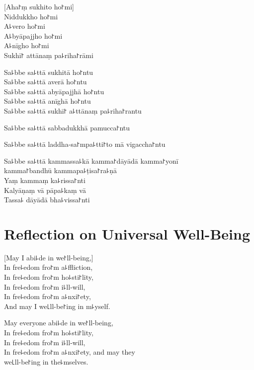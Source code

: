 \begin{leader}
\end{leader}

[Aha꜓ṃ sukhito ho꜓mi]\\
Niddukkho ho꜓mi\\
A꜕vero ho꜓mi\\
A꜕byāpajjho ho꜓mi\\
A꜕nīgho ho꜓mi\\
Sukhī꜓ attānaṃ pa꜕riha꜓rāmi

Sa꜕bbe sa꜕ttā sukhitā ho꜓ntu\\
Sa꜕bbe sa꜕ttā averā ho꜓ntu\\
Sa꜕bbe sa꜕ttā abyāpajjhā ho꜓ntu\\
Sa꜕bbe sa꜕ttā anīghā ho꜓ntu\\
Sa꜕bbe sa꜕ttā sukhī꜓ a꜕ttānaṃ pa꜕riha꜓rantu

Sa꜕bbe sa꜕ttā sabbadukkhā pamucca꜓ntu

Sa꜕bbe sa꜕ttā laddha-sa꜓mpa꜕tti꜓to mā vigaccha꜓ntu

Sa꜕bbe sa꜕ttā kammassa꜕kā kamma꜓dāyādā kamma꜓yonī\\
\vin kamma꜓bandhū kammapa꜕ṭisa꜓ra꜕ṇā\\
Yaṃ kammaṃ ka꜕rissa꜓nti\\
Kalyāṇaṃ vā pāpa꜕kaṃ vā\\
Tassa꜕ dāyādā bha꜕vissa꜓nti

\chapter[Universal Well-Being]{Reflection on Universal Well-Being}%


\begin{leader}
\end{leader}

[May I abi꜕de in we꜓ll-being,]\\
In fre꜕edom fro꜓m a꜕ffliction,\\
In fre꜕edom fro꜓m ho꜕sti꜓lity,\\
In fre꜕edom fro꜓m i꜕ll-will,\\
In fre꜕edom fro꜓m a꜕nxi꜓ety,\\
And may I  we꜖ll-be꜓ing in m꜕yself.

May everyone abi꜕de in we꜓ll-being,\\
In fre꜕edom fro꜓m ho꜕sti꜓lity,\\
In fre꜕edom fro꜓m i꜕ll-will,\\
In fre꜕edom fro꜓m a꜕nxi꜓ety, and may they\\
 we꜖ll-be꜓ing in the꜕mselves.

